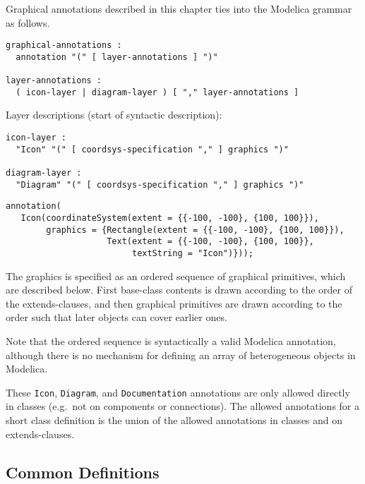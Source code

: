 Graphical annotations described in this chapter ties into the Modelica
grammar as follows.
\begin{lstlisting}[language=grammar]
graphical-annotations :
  annotation "(" [ layer-annotations ] ")"

layer-annotations :
  ( icon-layer | diagram-layer ) [ "," layer-annotations ]
\end{lstlisting}
Layer descriptions (start of syntactic description):
\begin{lstlisting}[language=grammar]
icon-layer :
  "Icon" "(" [ coordsys-specification "," ] graphics ")"

diagram-layer :
  "Diagram" "(" [ coordsys-specification "," ] graphics ")"
\end{lstlisting}%

\begin{example}
\begin{lstlisting}[language=modelica]
annotation(
   Icon(coordinateSystem(extent = {{-100, -100}, {100, 100}}),
        graphics = {Rectangle(extent = {{-100, -100}, {100, 100}}),
                    Text(extent = {{-100, -100}, {100, 100}},
                         textString = "Icon")}));
\end{lstlisting}
\end{example}

The graphics is specified as an ordered sequence of graphical
primitives, which are described below. First base-class contents is
drawn according to the order of the extends-clauses, and then graphical
primitives are drawn according to the order such that later objects can
cover earlier ones.

\begin{nonnormative}
Note that the ordered sequence is syntactically a valid Modelica annotation, although there
is no mechanism for defining an array of heterogeneous objects in Modelica.
\end{nonnormative}

These \lstinline!Icon!, \lstinline!Diagram!, and \lstinline!Documentation! annotations are only allowed directly in classes (e.g.\ not on components or connections).
The allowed annotations for a short class definition is the union of the allowed annotations in classes and on extends-clauses.

\subsection{Common Definitions}\label{common-definitions}

